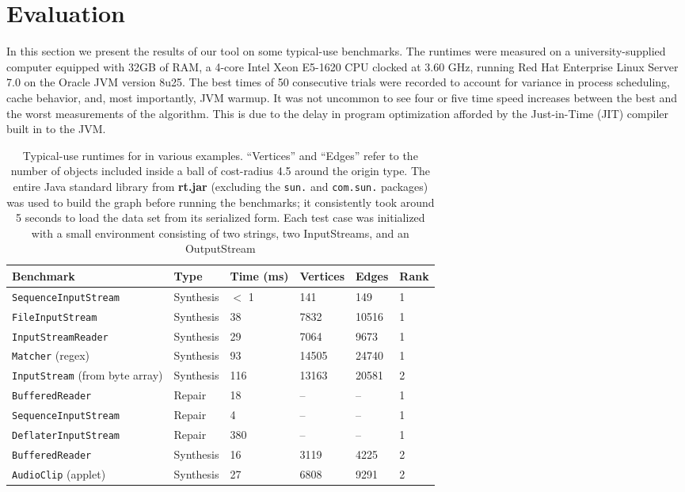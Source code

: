 \section{Evaluation}
\label{sec:evaluation}

In this section we present the results of our tool on some typical-use benchmarks. The runtimes were measured on a university-supplied computer equipped with 32GB of RAM, a 4-core Intel Xeon E5-1620 CPU clocked at 3.60 GHz, running Red Hat Enterprise Linux Server 7.0 on the Oracle JVM version 8u25. The best times of 50 consecutive trials were recorded to account for variance in process scheduling, cache behavior, and, most importantly, JVM warmup. It was not uncommon to see four or five time speed increases between the best and the worst measurements of the algorithm. This is due to the delay in program optimization afforded by the Just-in-Time (JIT) compiler built in to the JVM.

\begin{table*}[t]
  \centering
  \renewcommand{\arraystretch}{1.25}
  \begin{tabularx}{\textwidth}{| X | l | l | l | l | l |}
    \hline
    \textbf{Benchmark} & \textbf{Type} & \textbf{Time (ms)} & \textbf{Vertices} & \textbf{Edges} & \textbf{Rank} \\ \hline
	\texttt{SequenceInputStream} & Synthesis & $<$ 1 & 141   & 149   & 1 \\ \hline
    \texttt{FileInputStream}     & Synthesis & 38  & 7832  & 10516 & 1 \\ \hline
    \texttt{InputStreamReader}   & Synthesis & 29  & 7064  & 9673  & 1 \\ \hline
    \texttt{Matcher} (regex)     & Synthesis & 93  & 14505 & 24740 & 1 \\ \hline
    \texttt{InputStream} (from byte array) & Synthesis & 116 & 13163  & 20581  & 2 \\ \hline
    \texttt{BufferedReader}      & Repair    & 18  & --    & --    & 1 \\ \hline
    \texttt{SequenceInputStream} & Repair    & 4   & --    & --    & 1 \\ \hline
    \texttt{DeflaterInputStream} & Repair & 380 & -- & -- & 1 \\ \hline
    \texttt{BufferedReader}      & Synthesis & 16  & 3119  & 4225  & 2 \\ \hline
    \texttt{AudioClip} (applet)  & Synthesis & 27  & 6808  & 9291  & 2 \\ \hline
  \end{tabularx}
  \caption{Typical-use runtimes for \ourTool in various examples. ``Vertices'' and ``Edges'' refer to the number of objects included inside a ball of cost-radius 4.5 around the origin type. The entire Java standard library from \textbf{rt.jar} (excluding the \texttt{sun.} and \texttt{com.sun.} packages) was used to build the graph before running the benchmarks; it consistently took around 5 seconds to load the data set from its serialized form. Each test case was initialized with a small environment consisting of two strings, two InputStreams, and an OutputStream}
  \label{eval:runtime}
\end{table*}

